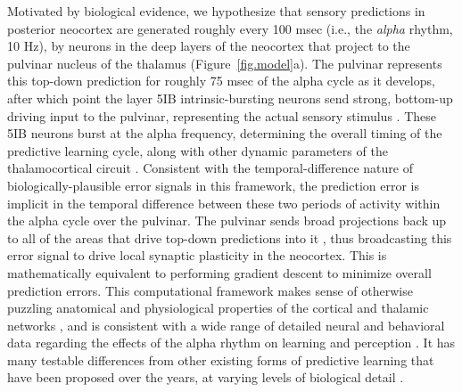\documentclass[12pt,twoside]{article}
\newif\myifpdf
\begin{document}
Motivated by biological evidence, we hypothesize that sensory predictions in posterior neocortex are generated roughly every 100 msec (i.e., the {\em alpha} rhythm, 10 Hz), by neurons in the deep layers of the neocortex that project to the pulvinar nucleus of the thalamus (Figure~\ref{fig.model}a).  The pulvinar represents this top-down prediction for roughly 75 msec of the alpha cycle as it develops, after which point the layer 5IB intrinsic-bursting neurons send strong, bottom-up driving input to the pulvinar, representing the actual sensory stimulus \cite{ShermanGuillery06}.  These 5IB neurons burst at the alpha frequency, determining the overall timing of the predictive learning cycle, along with other dynamic parameters of the thalamocortical circuit \cite{LorinczKekesiJuhaszEtAl09,FranceschettiGuatteoPanzicaEtAl95,SaalmannPinskWangEtAl12}.  Consistent with the temporal-difference nature of biologically-plausible error signals in this framework, the prediction error is implicit in the temporal difference between these two periods of activity within the alpha cycle over the pulvinar.  The pulvinar sends broad projections back up to all of the areas that drive top-down predictions into it \cite{Shipp03,Mumford91}, thus broadcasting this error signal to drive local synaptic plasticity in the neocortex. This is mathematically equivalent to performing gradient descent to minimize overall prediction errors.  This computational framework makes sense of otherwise puzzling anatomical and physiological properties of the cortical and thalamic networks \cite{ShermanGuillery06}, and is consistent with a wide range of detailed neural and behavioral data regarding the effects of the alpha rhythm on learning and perception \cite{BuffaloFriesLandmanEtAl11,VanRullenKoch03,JensenBonnefondVanRullen12,FiebelkornKastner19}.  It has many testable differences from other existing forms of predictive learning that have been proposed over the years, at varying levels of biological detail \cite{Mumford92,RaoBallard99,KawatoHayakawaInui93,Friston05}.
\end{document}
